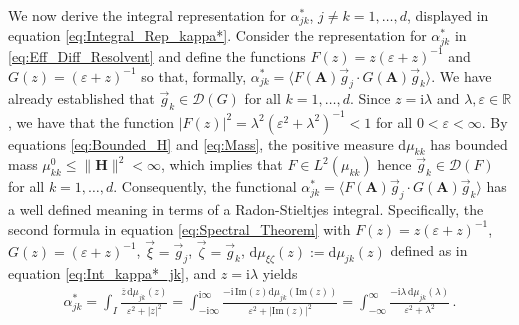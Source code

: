 \documentclass[11pt]{amsart}
\newcommand{\I}{\mathrm{i}}
\renewcommand{\d}{\mathrm{d}}
\newcommand{\Hb}{\mathbf{H}}
\newcommand{\Ab}{\mathbf{A}}
\newcommand{\Qb}{\mathbf{Q}}
\newcommand{\Ds}{\mathscr{D}}
\begin{document}
We now derive the integral representation for $\alpha^*_{jk}$, $j\neq k=1,\ldots,d$,
displayed in equation \eqref{eq:Integral_Rep_kappa*}. Consider the
representation for $\alpha^*_{jk}$ in \eqref{eq:Eff_Diff_Resolvent} and
define the functions $F(z)=z(\varepsilon+z)^{-1}$ and $G(z)=(\varepsilon+z)^{-1}$ so that,
formally, $\alpha^*_{jk}=\langle F(\Ab)\vec{g}_j\cdot G(\Ab)\vec{g}_k\rangle$. We have
already established that $\vec{g}_k\in\Ds(G)$ for all
$k=1,\ldots,d$. Since $z=\I\lambda$ and $\lambda,\varepsilon\in\mathbb{R}$, we have that the
function $|F(z)|^2=\lambda^2(\varepsilon^2+\lambda^2)^{-1}<1$ for all $0<\varepsilon<\infty$.  By equations
\eqref{eq:Bounded_H} and \eqref{eq:Mass}, the positive measure
$\d\mu_{kk}$ has bounded mass $\mu^0_{kk}\leq\|\Hb\|^2<\infty$, which implies that
$F\in L^2(\mu_{kk})$ hence $\vec{g}_k\in\Ds(F)$ for all
$k=1,\ldots,d$. Consequently, the functional $\alpha^*_{jk}=\langle F(\Ab)\vec{g}_j\cdot
G(\Ab)\vec{g}_k\rangle$ has a well defined 
meaning in terms of a Radon-Stieltjes integral. Specifically, the
second formula in equation \eqref{eq:Spectral_Theorem} with
$F(z)=z(\varepsilon+z)^{-1}$, $G(z)=(\varepsilon+z)^{-1}$, $\vec{\xi}=\vec{g}_j$,
$\vec{\zeta}=\vec{g}_k$, $\d\mu_{\xi\zeta}(z):=\d\mu_{jk}(z)$ defined as in equation
\eqref{eq:Int_kappa*_jk}, 
and $z=\I\lambda$ yields          
%
\begin{align}\label{eq:Int_alpha*_jk}
  \alpha^*_{jk}
     =\int_I\frac{\overline{z}\,\d\mu_{jk}(z)}{\varepsilon^2+|z|^2}
     =\int_{-\I\infty}^{\I\infty}\frac{-\I\,\text{Im}(z)\d\mu_{jk}(\text{Im}(z))}{\varepsilon^2+|\text{Im}(z)|^2}
     =\int_{-\infty}^\infty\frac{-\I\lambda\,\d\mu_{jk}(\lambda)}{\varepsilon^2+\lambda^2}\,.
\end{align}
%
\end{document}
